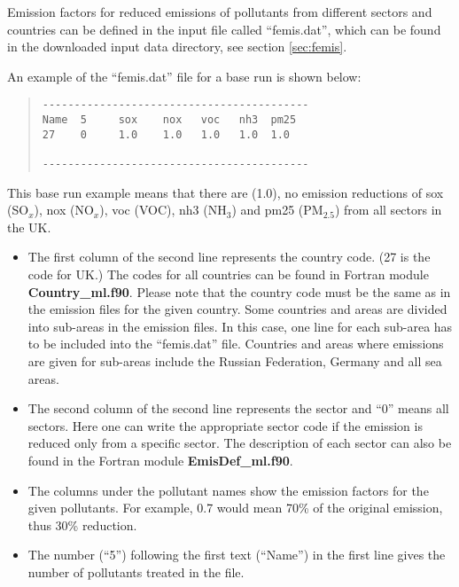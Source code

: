 Emission factors for reduced emissions of pollutants from different
sectors and countries can be defined in the input file called
``femis.dat'', which can be found in the downloaded input data
directory, see section \ref{sec:femis}.

An example of the ``femis.dat'' file for a base run is shown below:
\begin{quote}

\begin{verbatim}
------------------------------------------
Name  5     sox    nox   voc   nh3  pm25
27    0     1.0    1.0   1.0   1.0  1.0  

------------------------------------------
\end{verbatim}
\end{quote}
\noindent
This base run example means that there are (1.0), no emission reductions of sox (SO$_x$),
nox (NO$_x$), voc (VOC), nh3 (NH$_3$) and pm25 (PM$_{2.5}$) from all
sectors in the UK. 

\begin{itemize}

\item The first column of
the second line represents the country code. (27 is the code for UK.)
The codes for all countries can be found in  Fortran module {\bf
  Country\_ml.f90}. Please note that the country code must be the same
as in the emission files for the given country. Some
countries and areas are divided into sub-areas in the emission
files. In this case, one line for each sub-area has to be included
into the ``femis.dat'' file. Countries and areas where emissions are
given for sub-areas include the Russian Federation, Germany and all 
sea areas.    

\item The second
column of the second line 
represents the sector and ``0'' means all sectors. Here one can write
the appropriate sector code if the emission is reduced only from a specific
sector. The description of each sector can also be found in the Fortran
module {\bf EmisDef\_ml.f90}. 

\item The columns under the pollutant names show the emission factors
  for the given pollutants. For example, 0.7 would mean 70\% of the
  original emission, thus 30\% reduction.


\item The number (``5'') following
the first text (``Name'') in the first line gives the number of
pollutants treated in the file.   
              
\end{itemize}


